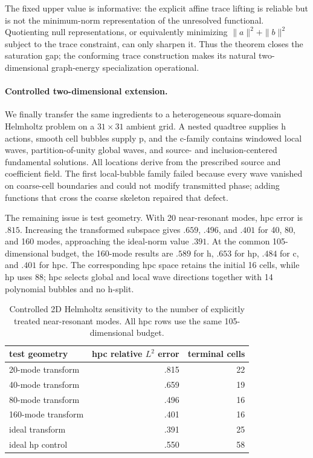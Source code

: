 \documentclass[11pt]{article}
\numberwithin{algorithm}{section}
\theoremstyle{definition}\newtheorem{definition}[theorem]{Definition}
\theoremstyle{remark}\newtheorem{remark}[theorem]{Remark}
\begin{document}
The fixed upper value is informative: the explicit affine trace lifting is
reliable but is not the minimum-norm representation of the unresolved
functional.  Quotienting null representations, or equivalently minimizing
$\|a\|^2+\|b\|^2$ subject to the trace constraint, can only sharpen it.  Thus
the theorem closes the saturation gap; the conforming trace construction
makes its natural two-dimensional graph-energy specialization operational.

\paragraph{Controlled two-dimensional extension.}
We finally transfer the same ingredients to a heterogeneous square-domain
Helmholtz problem on a $31\times31$ ambient grid. A nested quadtree supplies h
actions, smooth cell bubbles supply p, and the c-family contains windowed local
waves, partition-of-unity global waves, and source- and inclusion-centered
fundamental solutions. All locations derive from the prescribed source and
coefficient field. The first local-bubble family failed because every
wave vanished on coarse-cell boundaries and could not modify transmitted
phase; adding functions that cross the coarse skeleton repaired that defect.

The remaining issue is test geometry. With 20 near-resonant modes, hpc error
is $.815$. Increasing the transformed subspace gives $.659$, $.496$, and
$.401$ for 40, 80, and 160 modes, approaching the ideal-norm value $.391$.
At the common 105-dimensional budget, the 160-mode results are $.589$ for h,
$.653$ for hp, $.484$ for c, and $.401$ for hpc. The corresponding hpc space
retains the initial 16 cells, while hp uses 88; hpc selects global and local
wave directions together with 14 polynomial bubbles and no h-split.

\begin{table}[t]
\centering
\caption{Controlled 2D Helmholtz sensitivity to the number of explicitly
treated near-resonant modes. All hpc rows use the same 105-dimensional budget.}
\begin{tabular}{lrr}
\toprule
test geometry & hpc relative $L^2$ error & terminal cells\\
\midrule
20-mode transform & .815 & 22\\
40-mode transform & .659 & 19\\
80-mode transform & .496 & 16\\
160-mode transform & .401 & 16\\
ideal transform & .391 & 25\\
ideal hp control & .550 & 58\\
\bottomrule
\end{tabular}
\label{tab:local-2d-helmholtz}
\end{table}
\end{document}
